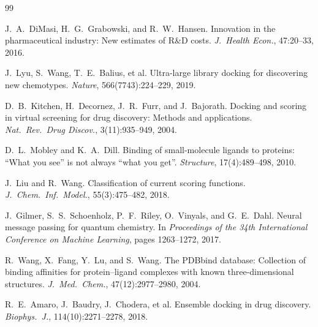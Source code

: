\documentclass[12pt,oneside]{report}
\begin{document}
\begin{thebibliography}{99}

J.\ A.\ DiMasi, H.\ G.\ Grabowski, and R.\ W.\ Hansen.
\newblock Innovation in the pharmaceutical industry: New estimates of R\&D costs.
\newblock \textit{J.\ Health Econ.}, 47:20--33, 2016.

J.\ Lyu, S.\ Wang, T.\ E.\ Balius, et al.
\newblock Ultra-large library docking for discovering new chemotypes.
\newblock \textit{Nature}, 566(7743):224--229, 2019.

D.\ B.\ Kitchen, H.\ Decornez, J.\ R.\ Furr, and J.\ Bajorath.
\newblock Docking and scoring in virtual screening for drug discovery: Methods and applications.
\newblock \textit{Nat.\ Rev.\ Drug Discov.}, 3(11):935--949, 2004.

D.\ L.\ Mobley and K.\ A.\ Dill.
\newblock Binding of small-molecule ligands to proteins: ``What you see'' is not always ``what you get''.
\newblock \textit{Structure}, 17(4):489--498, 2010.

J.\ Liu and R.\ Wang.
\newblock Classification of current scoring functions.
\newblock \textit{J.\ Chem.\ Inf.\ Model.}, 55(3):475--482, 2018.

J.\ Gilmer, S.\ S.\ Schoenholz, P.\ F.\ Riley, O.\ Vinyals, and G.\ E.\ Dahl.
\newblock Neural message passing for quantum chemistry.
\newblock In \textit{Proceedings of the 34th International Conference on Machine Learning}, pages 1263--1272, 2017.

R.\ Wang, X.\ Fang, Y.\ Lu, and S.\ Wang.
\newblock The PDBbind database: Collection of binding affinities for protein--ligand complexes with known three-dimensional structures.
\newblock \textit{J.\ Med.\ Chem.}, 47(12):2977--2980, 2004.

R.\ E.\ Amaro, J.\ Baudry, J.\ Chodera, et al.
\newblock Ensemble docking in drug discovery.
\newblock \textit{Biophys.\ J.}, 114(10):2271--2278, 2018.

\end{thebibliography}
\end{document}
